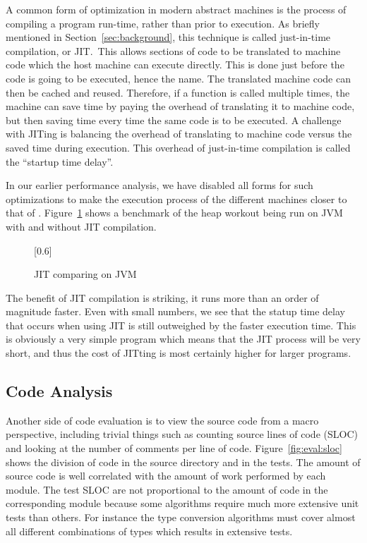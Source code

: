 A common form of optimization in modern abstract machines is the process of
compiling a program run-time, rather than prior to execution. As briefly
mentioned in Section~\ref{sec:background}, this technique is called just-in-time
compilation, or JIT.~This allows sections of code to be translated to machine
code which the host machine can execute directly. This is done just before the
code is going to be executed, hence the name. The translated machine code can
then be cached and reused. Therefore, if a function is called multiple times,
the machine can save time by paying the overhead of translating it to machine
code, but then saving time every time the same code is to be executed. A
challenge with JITing is balancing the overhead of translating to machine code
versus the saved time during execution. This overhead of just-in-time
compilation is called the ``startup time delay''.

In our earlier performance analysis, we have disabled all forms for such
optimizations to make the execution process of the different machines closer to
that of \thename{}. Figure~\ref{fig:eval:benchmark:jit} shows a benchmark of the
heap workout being run on JVM with and without JIT compilation.

\begin{figure}[H]
  \centering
  \scalebox{0.8}[0.6]{}
  \caption{JIT comparing on JVM}
\label{fig:eval:benchmark:jit}
\end{figure}

The benefit of JIT compilation is striking, it runs more than an order of
magnitude faster. Even with small numbers, we see that the statup time delay
that occurs when using JIT is still outweighed by the faster execution
time. This is obviously a very simple program which means that the JIT process
will be very short, and thus the cost of JITting is most certainly higher for
larger programs.

\subsection{Code Analysis}

Another side of code evaluation is to view the source code from a macro
perspective, including trivial things such as counting source lines of code
(SLOC) and looking at the number of comments per line of
code. Figure~\ref{fig:eval:sloc} shows the division of code in the source
directory and in the tests. The amount of source code is well correlated with
the amount of work performed by each module. The test SLOC are not proportional
to the amount of code in the corresponding module because some algorithms
require much more extensive unit tests than others. For instance the type
conversion algorithms must cover almost all different combinations of types
which results in extensive tests.

